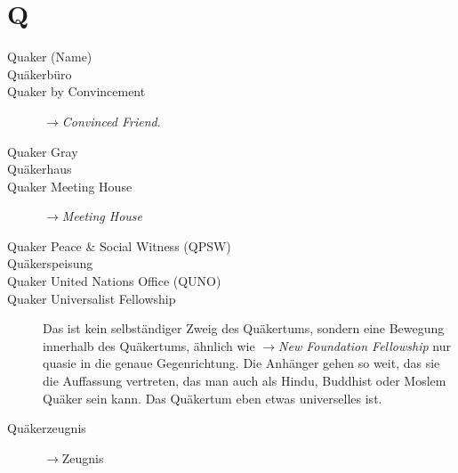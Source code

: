 \section*{Q}

\articlesize

\begin{description}

 \item[Quaker (Name)]

 \item[Quäkerbüro]

 \item[Quaker by Convincement] $\to$\textit{Convinced Friend}.

 \item[Quaker Gray]

 \item[Quäkerhaus]

 \item[Quaker Meeting House] $\to$\textit{Meeting House}

 \item[Quaker Peace \& Social Witness (QPSW)]

 \item[Quäkerspeisung]

 \item[Quaker United Nations Office (QUNO)]

 \item[Quaker Universalist Fellowship] Das ist kein selbständiger Zweig des Quäkertums, sondern eine Bewegung innerhalb des Quäkertums, ähnlich wie $\to$\textit{New Foundation Fellowship} nur quasie in die genaue Gegenrichtung. Die Anhänger gehen so weit, das sie die Auffassung vertreten, das man auch als Hindu, Buddhist oder Moslem Quäker sein kann. Das Quäkertum eben etwas universelles ist.

 \item[Quäkerzeugnis] $\to$Zeugnis


 \end{description}

\normalsize
